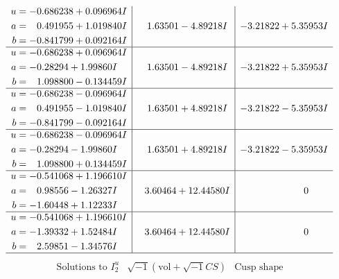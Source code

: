 \documentclass[1p]{elsarticle_modified}
\theoremstyle{definition}
\newcommand{\I}{\sqrt{-1}}
\begin{document}
$$\begin{array}{c|c|c}
\begin{aligned}
u &= -0.686238 + 0.096964 I \\
a &= \phantom{-}0.491955 + 1.019840 I \\
b &= -0.841799 + 0.092164 I\end{aligned}
 & \phantom{-}1.63501 - 4.89218 I & -3.21822 + 5.35953 I \\ \hline\begin{aligned}
u &= -0.686238 + 0.096964 I \\
a &= -0.28294 + 1.99860 I \\
b &= \phantom{-}1.098800 - 0.134459 I\end{aligned}
 & \phantom{-}1.63501 - 4.89218 I & -3.21822 + 5.35953 I \\ \hline\begin{aligned}
u &= -0.686238 - 0.096964 I \\
a &= \phantom{-}0.491955 - 1.019840 I \\
b &= -0.841799 - 0.092164 I\end{aligned}
 & \phantom{-}1.63501 + 4.89218 I & -3.21822 - 5.35953 I \\ \hline\begin{aligned}
u &= -0.686238 - 0.096964 I \\
a &= -0.28294 - 1.99860 I \\
b &= \phantom{-}1.098800 + 0.134459 I\end{aligned}
 & \phantom{-}1.63501 + 4.89218 I & -3.21822 - 5.35953 I \\ \hline\begin{aligned}
u &= -0.541068 + 1.196610 I \\
a &= \phantom{-}0.98556 - 1.26327 I \\
b &= -1.60448 + 1.12233 I\end{aligned}
 & \phantom{-}3.60464 + 12.44580 I & \phantom{-0.000000 } 0 \\ \hline\begin{aligned}
u &= -0.541068 + 1.196610 I \\
a &= -1.39332 + 1.52484 I \\
b &= \phantom{-}2.59851 - 1.34576 I\end{aligned}
 & \phantom{-}3.60464 + 12.44580 I & \phantom{-0.000000 } 0\\
 \hline 
 \end{array}$$\newpage$$\begin{array}{c|c|c}  
\text{Solutions to }I^u_{2}& \I (\text{vol} + \sqrt{-1}CS) & \text{Cusp shape}\\
 \hline 
\begin{aligned}

\end{aligned}
\end{array}$$
\end{document}
